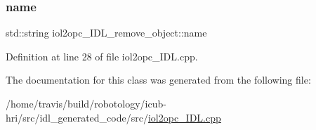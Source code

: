 \subsubsection{\texorpdfstring{name}{name}}
{\footnotesize\ttfamily std\+::string iol2opc\+\_\+\+I\+D\+L\+\_\+remove\+\_\+object\+::name}



Definition at line 28 of file iol2opc\+\_\+\+I\+D\+L.\+cpp.



The documentation for this class was generated from the following file\+:\begin{DoxyCompactItemize}
\item 
/home/travis/build/robotology/icub-\/hri/src/idl\+\_\+generated\+\_\+code/src/\hyperlink{iol2opc__IDL_8cpp}{iol2opc\+\_\+\+I\+D\+L.\+cpp}\end{DoxyCompactItemize}
